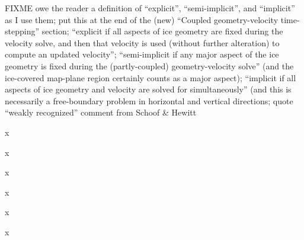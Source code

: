 \documentclass[letterpaper,final,12pt,reqno]{amsart}
\newenvironment{review}%
{\bigskip \par \begin{quote} \selectfont \sl}%
{\end{quote}}
\begin{document}
FIXME owe the reader a definition of ``explicit'', ``semi-implicit'', and ``implicit'' as I use them; put this at the end of the (new) ``Coupled geometry-velocity time-stepping'' section; ``explicit if all aspects of ice geometry are fixed during the velocity solve, and then that velocity is used (without further alteration) to compute an updated velocity''; ``semi-implicit if any major aspect of the ice geometry is fixed during the (partly-coupled) geometry-velocity solve'' (and the ice-covered map-plane region certainly counts as a major aspect); ``implicit if all aspects of ice geometry and velocity are solved for simultaneously'' (and this is necessarily a free-boundary problem in horizontal and vertical directions; quote ``weakly recognized'' comment from Schoof \& Hewitt

\begin{review}
\end{review}

\noindent x
\begin{review}
\end{review}

\noindent x
\begin{review}
\end{review}

\noindent x
\begin{review}
\end{review}

\noindent x
\begin{review}
\end{review}

\noindent x
\begin{review}
\end{review}

\noindent x
\end{document}
